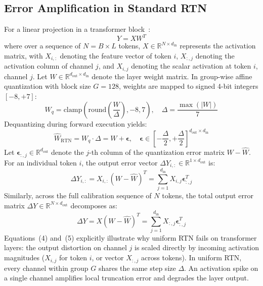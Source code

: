 \documentclass[runningheads,oribibl]{llncs}
\begin{document}
\subsection{Error Amplification in Standard RTN}
For a linear projection in a transformer block~\cite{vaswani2017attention}:
\begin{equation}
Y = X W^T
\end{equation}
where over a sequence of $N = B \times L$ tokens, $X \in \mathbb{R}^{N \times d_{\text{in}}}$ represents the activation matrix, with $X_{i, :}$ denoting the feature vector of token $i$, $X_{:, j}$ denoting the activation column of channel $j$, and $X_{i, j}$ denoting the scalar activation at token $i$, channel $j$. Let $W \in \mathbb{R}^{d_{\text{out}} \times d_{\text{in}}}$ denote the layer weight matrix. In group-wise affine quantization with block size $G=128$, weights are mapped to signed 4-bit integers $[-8, +7]$:
\begin{equation}
W_q = \text{clamp}\left( \text{round}\left( \frac{W}{\Delta} \right), -8, 7 \right), \quad \Delta = \frac{\max(|W|)}{7}
\end{equation}
Dequantizing during forward execution yields:
\begin{equation}
\widehat{W}_{\text{RTN}} = W_q \cdot \Delta = W + \boldsymbol{\epsilon}, \quad \boldsymbol{\epsilon} \in \left[ -\frac{\Delta}{2}, +\frac{\Delta}{2} \right]^{d_{\text{out}} \times d_{\text{in}}}
\end{equation}
Let $\boldsymbol{\epsilon}_{:, j} \in \mathbb{R}^{d_{\text{out}}}$ denote the $j$-th column of the quantization error matrix $W - \widehat{W}$. For an individual token $i$, the output error vector $\Delta Y_{i, :} \in \mathbb{R}^{1 \times d_{\text{out}}}$ is:
\begin{equation}
\Delta Y_{i, :} = X_{i, :} (W - \widehat{W})^T = \sum_{j=1}^{d_{\text{in}}} X_{i, j} \boldsymbol{\epsilon}_{:, j}^T
\end{equation}
Similarly, across the full calibration sequence of $N$ tokens, the total output error matrix $\Delta Y \in \mathbb{R}^{N \times d_{\text{out}}}$ decomposes as:
\begin{equation}
\Delta Y = X (W - \widehat{W})^T = \sum_{j=1}^{d_{\text{in}}} X_{:, j} \boldsymbol{\epsilon}_{:, j}^T
\end{equation}
Equations~(4) and~(5) explicitly illustrate why uniform RTN fails on transformer layers: the output distortion on channel $j$ is scaled directly by incoming activation magnitudes ($X_{i, j}$ for token $i$, or vector $X_{:, j}$ across tokens). In uniform RTN, every channel within group $G$ shares the same step size $\Delta$. An activation spike on a single channel amplifies local truncation error and degrades the layer output.
\end{document}
